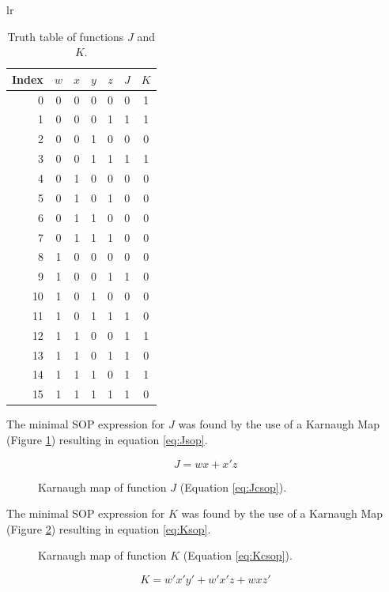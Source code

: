 \documentclass[12pt]{article}
\begin{document}
\begin{table}[tbp]
\begin{center}
\begin{tabular}{lr}
\begin{tabular}[t]{r|cccc|c|c}
Index&$w$&$x$&$y$&$z$&$J$&$K$\\
\hline
0 &0&0&0&0 &0 &1\\
1 &0&0&0&1 &1 &1\\
2 &0&0&1&0 &0 &0\\
3 &0&0&1&1 &1 &1\\
4 &0&1&0&0 &0 &0\\
5 &0&1&0&1 &0 &0\\
6 &0&1&1&0 &0 &0\\
7 &0&1&1&1 &0 &0\\
8 &1&0&0&0 &0 &0\\
9 &1&0&0&1 &1 &0\\
10 &1&0&1&0 &0 &0\\
11 &1&0&1&1 &1 &0\\
12 &1&1&0&0 &1 &1\\
13 &1&1&0&1 &1 &0\\
14 &1&1&1&0 &1 &1\\
15 &1&1&1&1 &1 &0\\
\end{tabular}
\end{tabular}
\end{center}
\caption{Truth table of functions $J$ and $K$.}
\label{tbl:tt}
\end{table}

The minimal SOP expression for $J$ was found by the use of a Karnaugh Map
(Figure \ref{fig:Jmap}) resulting in equation \ref{eq:Jsop}.

\begin{equation}
J = w x + x' z \label{eq:Jsop}
\end{equation}
\begin{figure}[!hbt]
\begin{center}
\end{center}
\caption{Karnaugh map of function $J$ (Equation \ref{eq:Jcsop}).}
\label{fig:Jmap}
\end{figure}

The minimal SOP expression for $K$ was found by the use of a Karnaugh Map
(Figure \ref{fig:Kmap}) resulting in equation \ref{eq:Ksop}.

\begin{figure}[tbp]
\begin{center}
\end{center}
\caption{Karnaugh map of function $K$ (Equation \ref{eq:Kcsop}).}
\label{fig:Kmap}
\end{figure}
\begin{equation}
K = w'x'y' + w'x'z + wxz' \label{eq:Ksop}
\end{equation}
\end{document}
